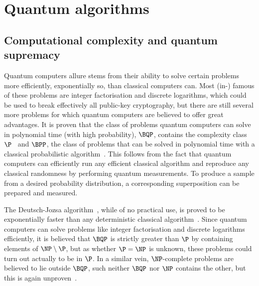 \section{Quantum algorithms}
\subsection{Computational complexity and quantum supremacy}
Quantum computers allure stems from their ability to solve certain problems more efficiently, exponentially so, than classical computers can.
Most (in-) famous of these problems are integer factorisation and discrete logarithms, which could be used to break effectively all public-key cryptography, but there are still several more problems for which quantum computers are believed to offer great advantages.
It is proven that the class of problems quantum computers can solve in polynomial time (with high probability), $\BQP$, contains the complexity class $\P$~\autocite{nielsen2012} and $\BPP$, the class of problems that can be solved in polynomial time with a classical probabilistic algorithm~\autocite{nielsen2012}.
This follows from the fact that quantum computers can efficiently run any efficient classical algorithm and reproduce any classical randomness by performing quantum measurements.
To produce a sample from a desired probability distribution, a corresponding superposition can be prepared and measured.

The Deutsch-Jozsa algorithm~\autocite{deutsch1992}, while of no practical use, is proved to be exponentially faster than any deterministic classical algorithm\footnotemark~\autocite{simon1994}.
Since quantum computers can solve problems like integer factorisation and discrete logarithms efficiently, it is believed that $\BQP$ is strictly greater than $\P$ by containing elements of $\NP \setminus \P$, but as whether $\P = \NP$ is unknown, these problems could turn out actually to be in $\P$.
In a similar vein, $\NP$-complete problems are believed to lie outside $\BQP$, such neither $\BQP$ nor $\NP$ contains the other, but this is again unproven~\autocite{aaronson2010}.


